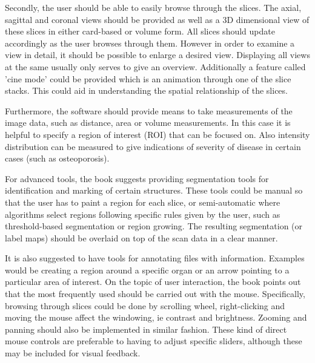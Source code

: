 \documentclass[a4paper,11pt,titlepage]{article}
\begin{document}
Secondly, the user should be able to easily browse through the slices. The axial, sagittal and coronal views should be provided as well as a 3D dimensional view of these slices in either card-based or volume form. All slices should update accordingly as the user browses through them. However in order to examine a view in detail, it should be possible to enlarge a desired view. Displaying all views at the same usually only serves to give an overview. Additionally a feature called 'cine mode' could be provided which is an animation through one of the slice stacks. This could aid in understanding the spatial relationship of the slices.



Furthermore, the software should provide means to take measurements of the image data, such as distance, area or volume measurements. In this case it is helpful to specify a region of interest (ROI) that can be focused on. Also intensity distribution can be measured to give indications of severity of disease in certain cases (such as osteoporosis)\cite{book}.

For advanced tools, the book suggests providing segmentation tools for identification and marking of certain structures. These tools could be manual so that the user has to paint a region for each slice, or semi-automatic where algorithms select regions following specific rules given by the user, such as threshold-based segmentation or region growing. The resulting segmentation (or label maps) should be overlaid on top of the scan data in a clear manner.

It is also suggested to have tools for annotating files with information. Examples would be creating a region around a specific organ or an arrow pointing to a particular area of interest.
On the topic of user interaction, the book points out that the most frequently used should be carried out with the mouse. Specifically, browsing through slices could be done by scrolling wheel, right-clicking and moving the mouse affect the windowing, ie contrast and brightness. Zooming and panning should also be implemented in similar fashion. These kind of direct mouse controls are preferable to having to adjust specific sliders, although these may be included for visual feedback.
\end{document}
